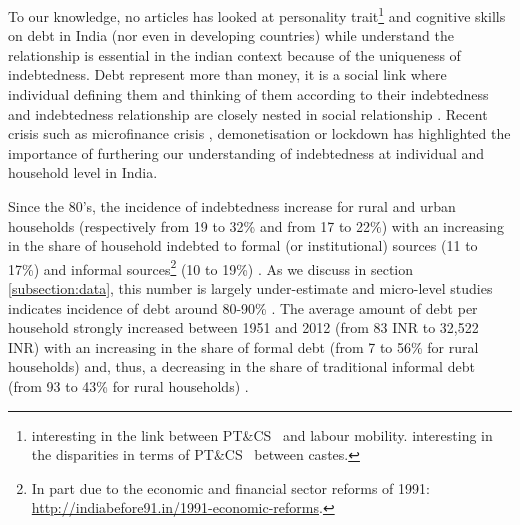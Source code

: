 \documentclass[a4paper, 11pt, onecolumn]{article}
\newcommand{\PTCS}{PT\&CS}
\begin{document}
To our knowledge, no articles has looked at personality trait\footnote{\cite{Michiels2021} interesting in the link between \PTCS~ and labour mobility. \cite{Dasgupta2020} interesting in the disparities in terms of \PTCS~ between castes.} and cognitive skills on debt in India (nor even in developing countries) while understand the relationship is essential in the indian context because of the uniqueness of indebtedness.
Debt represent more than money, it is a social link where individual defining them and thinking of them according to their indebtedness and indebtedness relationship are closely nested in social relationship \citep{Guerin2014}. 
Recent crisis such as microfinance crisis \citep{Nair2011, Sriram2010}, demonetisation \citep{GuerinDemo2017} or lockdown \citep{Guerin2021, Guerin2021b} has highlighted the importance of furthering our understanding of indebtedness at individual and household level in India.

Since the 80's, the incidence of indebtedness increase for rural and urban households (respectively from 19 to 32\% and from 17 to 22\%) with an increasing in the share of household indebted to formal (or institutional) sources (11 to 17\%) and informal sources\footnote{In part due to the economic and financial sector reforms of 1991: \url{http://indiabefore91.in/1991-economic-reforms}.} (10 to 19\%) \citep{Rajakumar2019}.
As we discuss in section \ref{subsection:data}, this number is largely under-estimate \citep{Jones1994} and micro-level studies indicates incidence of debt around 80-90\% \citep{Guerin2013a, Jones1994, Dreze1997, Reboul2021}.
The average amount of debt per household strongly increased between 1951 and 2012 (from 83 INR to 32,522 INR) with an increasing in the share of formal debt (from 7 to 56\% for rural households) and, thus, a decreasing in the share of traditional informal debt (from 93 to 43\% for rural households) \citep{Rajakumar2019}.
\end{document}
